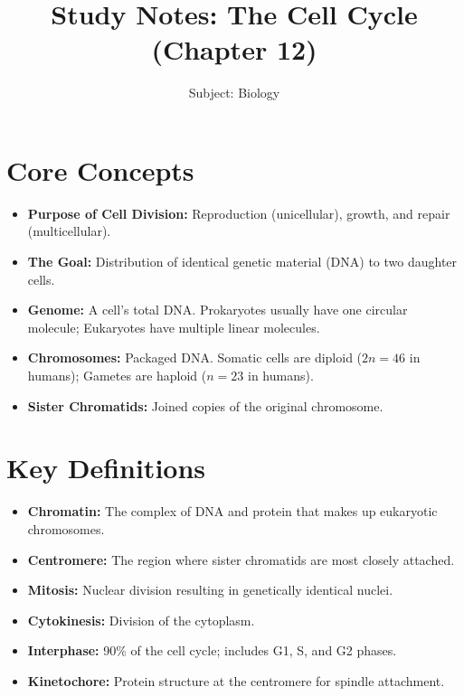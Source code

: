 \documentclass[11pt, a4paper]{article}
\title{Study Notes: The Cell Cycle (Chapter 12)}
\author{Subject: Biology}
\date{}
\begin{document}
\maketitle

\section*{Core Concepts}
\begin{itemize}
    \item \textbf{Purpose of Cell Division:} Reproduction (unicellular), growth, and repair (multicellular).
    \item \textbf{The Goal:} Distribution of identical genetic material (DNA) to two daughter cells.
    \item \textbf{Genome:} A cell's total DNA. Prokaryotes usually have one circular molecule; Eukaryotes have multiple linear molecules.
    \item \textbf{Chromosomes:} Packaged DNA. Somatic cells are diploid ($2n = 46$ in humans); Gametes are haploid ($n = 23$ in humans).
    \item \textbf{Sister Chromatids:} Joined copies of the original chromosome.
\end{itemize}

\section*{Key Definitions}
\begin{itemize}
    \item \textbf{Chromatin:} The complex of DNA and protein that makes up eukaryotic chromosomes.
    \item \textbf{Centromere:} The region where sister chromatids are most closely attached.
    \item \textbf{Mitosis:} Nuclear division resulting in genetically identical nuclei.
    \item \textbf{Cytokinesis:} Division of the cytoplasm.
    \item \textbf{Interphase:} 90\% of the cell cycle; includes G1, S, and G2 phases.
    \item \textbf{Kinetochore:} Protein structure at the centromere for spindle attachment.
\end{itemize}
\end{document}
